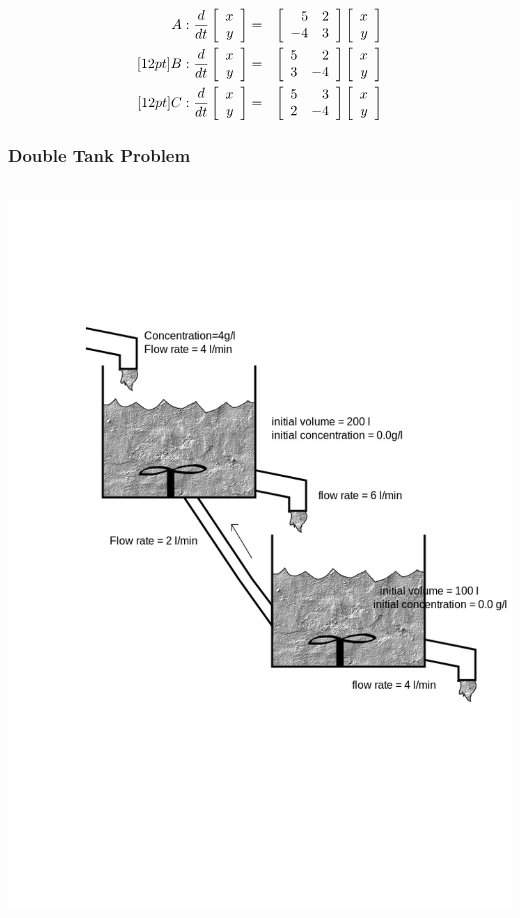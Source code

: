 {\begin{frame}
{        \begin{eqnarray*}
          A: \frac{d}{dt} \vecTwo{x}{y} & = & \arrayTwo{5}{2}{-4}{3} \vecTwo{x}{y} \\ [12pt]
          B: \frac{d}{dt} \vecTwo{x}{y} & = & \arrayTwo{5}{2}{3}{-4} \vecTwo{x}{y} \\ [12pt]
          C: \frac{d}{dt} \vecTwo{x}{y} & = & \arrayTwo{5}{3}{2}{-4} \vecTwo{x}{y} 
        \end{eqnarray*}

          \vfill

     }\fi

    \vfill
    \vfill
    \vfill

\end{frame}

}


\begin{frame}
  \frametitle{Double Tank Problem}

  \begin{columns}
    {\includegraphics[width=1.5\textwidth]{img/introLinearAlgebraTankProblem}}    


\end{columns}
\end{frame}
